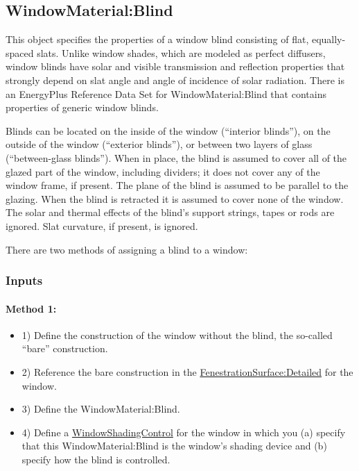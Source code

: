 \subsection{WindowMaterial:Blind}\label{windowmaterialblind}

This object specifies the properties of a window blind consisting of flat, equally-spaced slats. Unlike window shades, which are modeled as perfect diffusers, window blinds have solar and visible transmission and reflection properties that strongly depend on slat angle and angle of incidence of solar radiation. There is an EnergyPlus Reference Data Set for WindowMaterial:Blind that contains properties of generic window blinds.

Blinds can be located on the inside of the window (``interior blinds''), on the outside of the window (``exterior blinds''), or between two layers of glass (``between-glass blinds''). When in place, the blind is assumed to cover all of the glazed part of the window, including dividers; it does not cover any of the window frame, if present. The plane of the blind is assumed to be parallel to the glazing. When the blind is retracted it is assumed to cover none of the window. The solar and thermal effects of the blind's support strings, tapes or rods are ignored. Slat curvature, if present, is ignored.

There are two methods of assigning a blind to a window:

\subsubsection{Inputs}\label{inputs-23-005}

\paragraph{Method 1:}\label{method-1-1}
\begin{itemize}
\item 1) Define the construction of the window without the blind, the so-called ``bare'' construction.

\item 2) Reference the bare construction in the \hyperref[fenestrationsurfacedetailed]{FenestrationSurface:Detailed} for the window.

\item 3) Define the WindowMaterial:Blind.

\item 4) Define a \hyperref[windowpropertyshadingcontrol]{WindowShadingControl} for the window in which you (a) specify that this WindowMaterial:Blind is the window's shading device and (b) specify how the blind is controlled.

\end{itemize}


